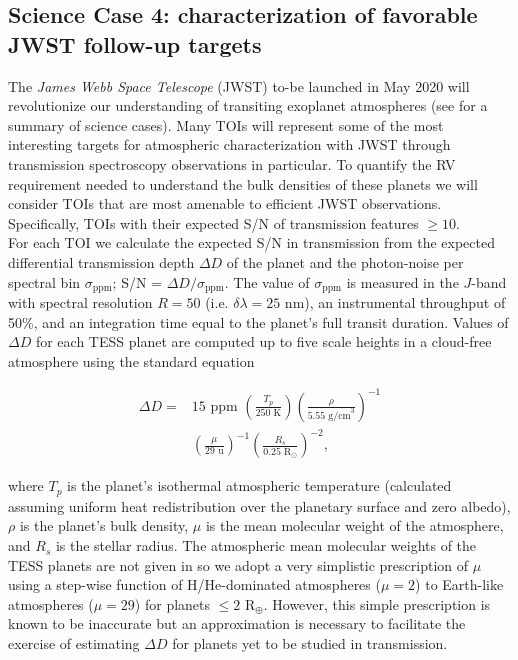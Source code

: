 \subsection{Science Case 4: characterization of favorable JWST follow-up targets} \label{RVFCsect:jwst}
The \emph{James Webb Space Telescope} (JWST) to-be launched in May 2020 will revolutionize our
understanding of transiting exoplanet atmospheres (see \citealt{beichman14} for a summary of science cases).
Many TOIs will represent some of the most interesting targets for atmospheric characterization with
JWST through transmission spectroscopy observations in particular. To quantify the RV requirement needed
to understand the bulk densities of these planets we will consider TOIs that are most amenable to
efficient JWST observations. Specifically, TOIs with their expected S/N of transmission features
$\geq 10$. \\

For each TOI we calculate the expected S/N in transmission from the expected
differential transmission depth $\Delta D$ of the planet and the photon-noise per spectral bin
$\sigma_{\text{ppm}}$; S/N = $\Delta D / \sigma_{\text{ppm}}$. The value of $\sigma_{\text{ppm}}$
is measured in the $J$-band with spectral resolution $R=50$ (i.e. $\delta \lambda = 25$ nm), an
instrumental throughput of 50\%, and an integration time equal to the planet's full transit duration.
Values of $\Delta D$ for each TESS planet are computed up to five
scale heights in a cloud-free atmosphere using the standard equation

\begin{equation}
  \begin{split}
    \Delta D = & 15 \text{ ppm } \left( \frac{T_p}{250 \text{ K}} \right)
    \left( \frac{\rho}{5.55 \text{ g/cm}^3} \right)^{-1} \\
    &\left( \frac{\mu}{29 \text{ u}} \right)^{-1}
    \left( \frac{R_s}{0.25 \text{ R}_{\odot}} \right)^{-2},
  \end{split}
  \label{RVFCeq:transm}
\end{equation}

\noindent where $T_p$ is the planet's isothermal atmospheric temperature (calculated assuming uniform heat
redistribution over the planetary surface and zero albedo), $\rho$ is the planet's
bulk density, $\mu$ is the mean molecular weight of the atmosphere, and $R_s$ is the stellar
radius. The atmospheric mean molecular weights of the TESS planets are not given in 
so we adopt a very simplistic prescription of $\mu$ using a step-wise function of H/He-dominated atmospheres
($\mu=2$) to Earth-like atmospheres ($\mu=29$) for planets $\leq 2$ R$_{\oplus}$. However, this simple prescription
is known to be inaccurate but an approximation is necessary to facilitate the exercise of estimating $\Delta D$
for planets yet to be studied in transmission. \\

